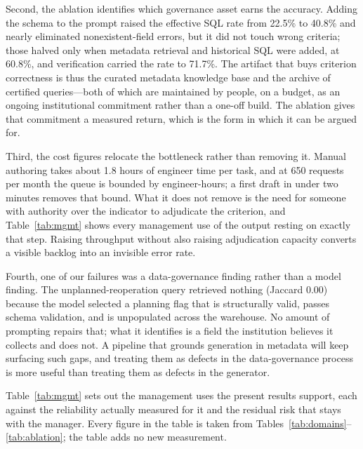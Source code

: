 \documentclass[applsci,article,submit,pdftex,oneauthor]{Definitions/mdpi}
\begin{document}
Second, the ablation identifies which governance asset earns the accuracy. Adding
the schema to the prompt raised the effective SQL rate from 22.5\% to 40.8\% and
nearly eliminated nonexistent-field errors, but it did not touch wrong criteria;
those halved only when metadata retrieval and historical SQL were added, at
60.8\%, and verification carried the rate to 71.7\%. The artifact that buys
criterion correctness is thus the curated metadata knowledge base and the archive
of certified queries---both of which are maintained by people, on a budget, as an
ongoing institutional commitment rather than a one-off build. The ablation gives
that commitment a measured return, which is the form in which it can be argued for.

Third, the cost figures relocate the bottleneck rather than removing it. Manual
authoring takes about 1.8 hours of engineer time per task, and at 650 requests per
month the queue is bounded by engineer-hours; a first draft in under two minutes
removes that bound. What it does not remove is the need for someone with authority
over the indicator to adjudicate the criterion, and Table~\ref{tab:mgmt} shows
every management use of the output resting on exactly that step. Raising
throughput without also raising adjudication capacity converts a visible backlog
into an invisible error rate.

Fourth, one of our failures was a data-governance finding rather than a model
finding. The unplanned-reoperation query retrieved nothing (Jaccard 0.00) because
the model selected a planning flag that is structurally valid, passes schema
validation, and is unpopulated across the warehouse. No amount of prompting
repairs that; what it identifies is a field the institution believes it collects
and does not. A pipeline that grounds generation in metadata will keep surfacing
such gaps, and treating them as defects in the data-governance process is more
useful than treating them as defects in the generator.

Table~\ref{tab:mgmt} sets out the management uses the present results support,
each against the reliability actually measured for it and the residual risk that
stays with the manager. Every figure in the table is taken from
Tables~\ref{tab:domains}--\ref{tab:ablation}; the table adds no new measurement.
\end{document}
